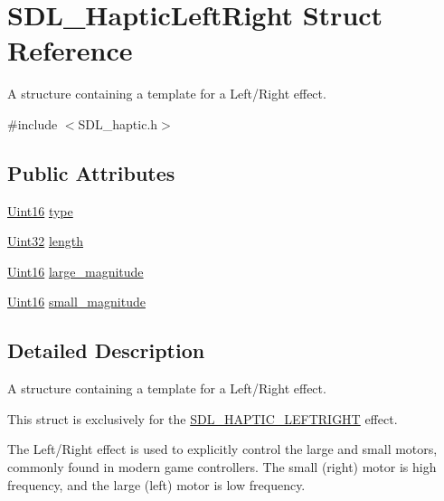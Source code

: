 \hypertarget{struct_s_d_l___haptic_left_right}{}\section{S\+D\+L\+\_\+\+Haptic\+Left\+Right Struct Reference}
\label{struct_s_d_l___haptic_left_right}


A structure containing a template for a Left/\+Right effect.  




{\ttfamily \#include $<$S\+D\+L\+\_\+haptic.\+h$>$}

\subsection*{Public Attributes}
\begin{DoxyCompactItemize}
\item 
\mbox{\hyperlink{_s_d_l__stdinc_8h_a31fcc0a076c9068668173ee26d33e42b}{Uint16}} \mbox{\hyperlink{struct_s_d_l___haptic_left_right_abef79eeb482a8e623e512f0c9635e1a1}{type}}
\item 
\mbox{\hyperlink{_s_d_l__stdinc_8h_add440eff171ea5f55cb00c4a9ab8672d}{Uint32}} \mbox{\hyperlink{struct_s_d_l___haptic_left_right_a5b942fee53f1ec77d3fb91a6e89b0196}{length}}
\item 
\mbox{\hyperlink{_s_d_l__stdinc_8h_a31fcc0a076c9068668173ee26d33e42b}{Uint16}} \mbox{\hyperlink{struct_s_d_l___haptic_left_right_a8cd16fe2200ef10cc4f3b4209adef959}{large\+\_\+magnitude}}
\item 
\mbox{\hyperlink{_s_d_l__stdinc_8h_a31fcc0a076c9068668173ee26d33e42b}{Uint16}} \mbox{\hyperlink{struct_s_d_l___haptic_left_right_aaa1f2c1e767a780e447d82efce6cd1cf}{small\+\_\+magnitude}}
\end{DoxyCompactItemize}


\subsection{Detailed Description}
A structure containing a template for a Left/\+Right effect. 

This struct is exclusively for the \mbox{\hyperlink{_s_d_l__haptic_8h_ae047624d8458ff6400887c37a36f86d3}{S\+D\+L\+\_\+\+H\+A\+P\+T\+I\+C\+\_\+\+L\+E\+F\+T\+R\+I\+G\+HT}} effect.

The Left/\+Right effect is used to explicitly control the large and small motors, commonly found in modern game controllers. The small (right) motor is high frequency, and the large (left) motor is low frequency.

